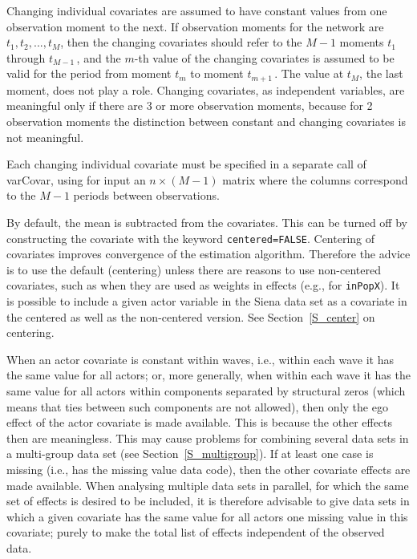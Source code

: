 \documentclass[a4paper,fleqn,11pt]{article}
\newcommand{\+}{\, + \,}
\newcommand{\sfn}[1]{\textsf{#1}}
\begin{document}
Changing individual covariates are assumed to have constant values from one
observation moment to the next. If observation moments for the
network are $t_1, t_2, ..., t_M$, then the changing covariates
should refer to the $M-1$ moments $t_1$ through $t_{M-1}\,$, and
the $m$-th value of the changing covariates is assumed to be valid
for the period from moment $t_m$ to moment $t_{m+1}\,$.
The value at $t_M$, the last moment, does not play a role.
Changing covariates, as independent variables, are meaningful
only if there are 3 or more observation moments,
because for 2 observation moments the distinction between
constant and changing covariates is not meaningful.

Each changing individual covariate must be specified
in a separate call of \sfn{varCovar}, using for input
an $n \times (M-1)$ matrix where the columns correspond to the $M-1$ periods
between observations.

By default, the mean is subtracted from the covariates.
This can be turned off by constructing the covariate with the keyword
\texttt{centered=FALSE}. Centering of covariates improves
convergence of the estimation algorithm.
Therefore the advice is to use the default (centering) unless there are reasons to
use non-centered covariates, such as when they are used as weights in effects
(e.g., for \texttt{inPopX}).
It is possible to include a given actor variable in the Siena data set
as a covariate in the centered as well as the non-centered version.
See Section~\ref{S_center} on centering.

\iffalse
When an actor covariate is constant within waves, i.e.,
within each wave it has the same value for all actors;
or, more generally, when within each wave it has the same value for
all actors
within components separated by structural zeros (which means that
ties between such components are not allowed), then only the ego effect
of the actor covariate is made available.
This is because the other effects then are meaningless.
This may cause problems for combining several data sets
in a multi-group data set (see Section~\ref{S_multigroup}).
If at least one case is missing (i.e., has the missing value data code),
then the other covariate effects are made available.
When analysing multiple data sets in parallel,
for which the same set of effects is desired to be included,
it is therefore advisable to give data sets in which
a given covariate has the same value for all actors
one missing value in this covariate; purely to make
the total list of effects independent of the observed data.
\end{document}
